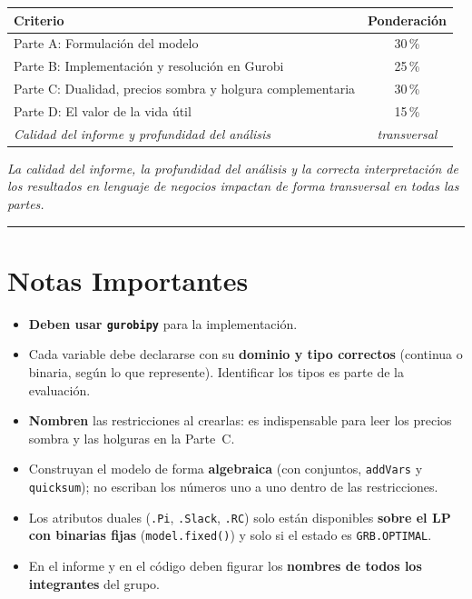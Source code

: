 \documentclass[12pt,a4paper]{article}
\begin{document}
\begin{center}
\renewcommand{\arraystretch}{1.2}
\begin{tabular}{lc}
\toprule
\textbf{Criterio} & \textbf{Ponderación} \\
\midrule
Parte A: Formulación del modelo                          & 30\,\% \\
Parte B: Implementación y resolución en Gurobi           & 25\,\% \\
Parte C: Dualidad, precios sombra y holgura complementaria & 30\,\% \\
Parte D: El valor de la vida útil                        & 15\,\% \\
\midrule
\textit{Calidad del informe y profundidad del análisis} &
\textit{transversal} \\
\bottomrule
\end{tabular}
\end{center}

\vspace{0.3em}
\noindent\textit{La calidad del informe, la profundidad del análisis y la correcta
interpretación de los resultados en lenguaje de negocios impactan de forma
transversal en todas las partes.}

\noindent\rule{\linewidth}{0.4pt}

\section*{Notas Importantes}

\begin{itemize}[topsep=2pt]
    \item \textbf{Deben usar \texttt{gurobipy}} para la implementación.
    \item Cada variable debe declararse con su \textbf{dominio y tipo correctos}
          (continua o binaria, según lo que represente). Identificar los tipos es
          parte de la evaluación.
    \item \textbf{Nombren} las restricciones al crearlas: es indispensable para
          leer los precios sombra y las holguras en la Parte~C.
    \item Construyan el modelo de forma \textbf{algebraica} (con conjuntos,
          \texttt{addVars} y \texttt{quicksum}); no escriban los números uno a uno
          dentro de las restricciones.
    \item Los atributos duales (\texttt{.Pi}, \texttt{.Slack}, \texttt{.RC}) solo
          están disponibles \textbf{sobre el LP con binarias fijas}
          (\texttt{model.fixed()}) y solo si el estado es \texttt{GRB.OPTIMAL}.
    \item En el informe y en el código deben figurar los \textbf{nombres de todos
          los integrantes} del grupo.
\end{itemize}
\end{document}
